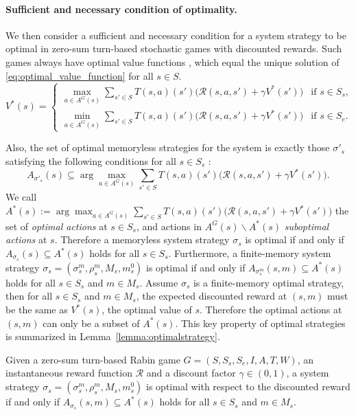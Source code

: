 \documentclass[runningheads,a4paper]{llncs}
\begin{document}
\paragraph{Sufficient and necessary condition of optimality.}
We then consider a sufficient and necessary condition for a system strategy to be optimal in zero-sum turn-based stochastic games with discounted rewards. 
Such games always have optimal value functions \cite{filar1996competitive}, which equal the unique solution of \eqref{eq:optimal_value_function} for all $s \in S$. 
\begin{equation}
V^*(s) = 
\begin{cases}
\max_{a \in A^G(s)} \sum_{s'\in S} T(s,a)(s') \big( \mathcal{R}(s,a,s') + \gamma V^*(s') \big) &\text{if }s \in S_s, \\
\min_{a \in A^G(s)} \sum_{s'\in S} T(s,a)(s') \big( \mathcal{R}(s,a,s') + \gamma V^*(s') \big) &\text{if }s \in S_e.
\end{cases}
\label{eq:optimal_value_function}
\end{equation}

Also, the set of optimal memoryless strategies for the system is exactly those $\sigma'_s$ satisfying the following conditions for all $s \in S_s$ \cite{filar1996competitive}: 
\begin{equation}
A_{\sigma'_s}(s) \subseteq \arg\max_{a \in A^G(s)} \sum_{s'\in S} T(s,a)(s') \big( \mathcal{R}(s,a,s') + \gamma V^*(s') \big). 
\label{eq:optimal_strategy}
\end{equation}
We call $A^*(s) := \arg\max_{a \in A^G(s)} \sum_{s'\in S} T(s,a)(s') \big( \mathcal{R}(s,a,s') + \gamma V^*(s') \big)$ the set of \emph{optimal actions} at $s \in S_s$, and actions in $A^G(s) \backslash A^*(s)$ \emph{suboptimal actions} at $s$. Therefore a memoryless system strategy $\sigma_s$ is optimal if and only if $A_{\sigma_s}(s) \subseteq A^*(s)$ holds for all $s \in S_s$. Furthermore, a finite-memory system strategy $\sigma_s = (\sigma_s^m, \rho_s^m, M_s, m_s^0)$ is optimal if and only if $A_{\sigma_s^m}(s, m) \subseteq A^*(s)$ holds for all $s \in S_s$ and $m \in M_s$. Assume $\sigma_s$ is a finite-memory optimal strategy, then for all $s \in S_s$ and $m \in M_s$, the expected discounted reward at $(s,m)$ must be the same as $V^*(s)$, the optimal value of $s$. Therefore the optimal actions at $(s,m)$ can only be a subset of $A^*(s)$. This key property of optimal strategies is summarized in Lemma~\ref{lemma:optimalstrategy}.

\begin{lemma}
Given a zero-sum turn-based Rabin game $G = (S, S_s, S_e, I, A, T, W)$, an instantaneous reward function $\mathcal{R}$ and a discount factor $\gamma \in (0,1)$, a system strategy $\sigma_s = (\sigma_s^m, \rho_s^m, M_s, m_s^0)$ is optimal with respect to the discounted reward if and only if $A_{\sigma_s}(s,m) \subseteq A^*(s)$ holds for all $s \in S_s$ and $m \in M_s$. 
\label{lemma:optimalstrategy}
\end{lemma}
\end{document}
